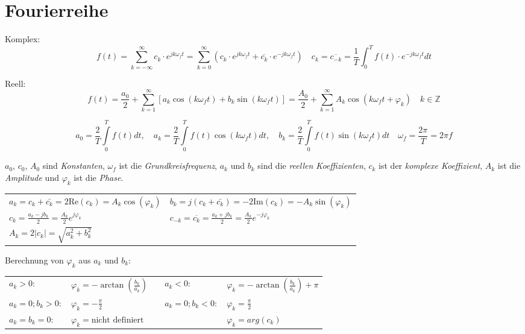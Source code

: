 \section{Fourierreihe}
Komplex:
\begin{equation}
\nonumber
\boxed{f(t) = \sum\limits_{k = -\infty}^{\infty} c_k \cdot e^{j k  	\omega_f t}}= \sum\limits_{k = 0}^{\infty} \left(c_k \cdot e^{j k \omega_f t} + \overline{c_k} \cdot e^{-j k \omega_f t}\right) \quad  \boxed{c_k=\overline{c_{-k}}=\frac{1}{T}\int_0^T{f(t)\cdot 	e^{-jk\omega_f t}dt}}
\end{equation}
	
\vspace{0.5cm}

Reell:
\[
\boxed{f(t) = \frac{a_0}{2} + \sum\limits_{k=1}^{\infty} \left[a_k \cos(k \omega_f t) + b_k \sin(k \omega_f t)\right]}=\frac{A_0}{2} + \sum\limits_{k=1}^{\infty} A_k \cos(k\omega_f t + \varphi_k) \quad k\in
  	\mathbb{Z}
\]	
	
\[\boxed{a_0 =
	\frac{2}{T}\int\limits_0^{T} f(t)dt, \quad a_k = \frac{2}{T}\int\limits_0^{T} f(t)\cos(k \omega_f t) dt, \quad b_k =
	\frac{2}{T}\int\limits_0^{T} f(t)\sin(k \omega_f t) dt} \quad
	\omega_f=\frac{2 \pi}{T}=2 \pi f
\]
	
\vspace{0.5cm}

$a_0$, $c_0$, $A_0$ sind \textit{Konstanten}, $\omega_f$ ist die \textit{Grundkreisfrequenz}, $a_k$ und $b_k$ sind die \textit{reellen Koeffizienten}, 
$c_k$ ist der \textit{komplexe Koeffizient}, $A_k$ ist die \textit{Amplitude} und $\varphi_k$ ist die \textit{Phase}.

\begin{tabular}{p{9cm}p{9cm}}
  $a_k = c_k + \bar{c_k} = 2 \text{Re}(c_k) = A_k \cos(\varphi_k)$ &
  $b_k = j(c_k + \bar{c_k}) = -2 \text{Im}(c_k) = -A_k \sin(\varphi_k)$ \\
  $c_k = \frac{a_k-jb_k}{2} = \frac{A_k}{2} e^{j\varphi_k}$ &
  $c_{-k} = \overline{c_k} = \frac{a_k+jb_k}{2} = \frac{A_k}{2} e^{-j\varphi_k}$ \\
  $A_k = 2|c_k| = \sqrt{a_k^2+b_k^2}$
\end{tabular}

\vspace{0.5cm}

Berechnung von $\varphi_k$ aus $a_k$ und $b_k$:\\
\begin{tabular}{p{2.5cm}p{3.5cm}p{2cm}p{2.5cm}p{3.5cm}}
	$a_k> 0:$ & $\varphi_k = -\arctan(\frac{b_k}{a_k})$ & &
	$a_k<0:$ &	$\varphi_k = -\arctan(\frac{b_k}{a_k}) + \pi$\\
	$a_k = 0; b_k > 0:$ &	$\varphi_k = -\frac{\pi}{2}$ & &
	$a_k = 0; b_k < 0:$ &	$\varphi_k = \frac{\pi}{2}$\\
	$a_k = b_k = 0:$ &	$\varphi_k = \text{nicht definiert}$ & & & $\varphi_k =
	arg(c_k)$
\end{tabular}

